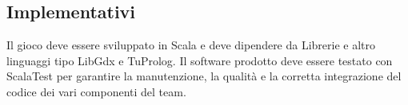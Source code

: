 \subsection{Implementativi}
Il gioco deve essere sviluppato in Scala e deve dipendere da Librerie e altro linguaggi tipo LibGdx e TuProlog.
Il software prodotto deve essere testato con ScalaTest per garantire la manutenzione, la qualità e la corretta integrazione del codice dei vari componenti del team.